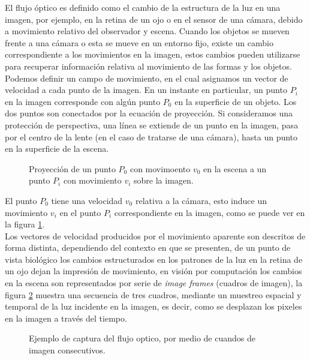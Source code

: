 \documentclass{iccmemoria}
\begin{document}
El flujo óptico es definido como el cambio de la estructura de la luz en una imagen, por ejemplo, en la retina de un ojo o en el sensor de una cámara, debido a movimiento relativo del observador y escena. Cuando los objetos se mueven frente a una cámara o esta se mueve en un entorno fijo, existe un cambio correspondiente a los movimientos en la imagen, estos cambios pueden utilizarse para recuperar información relativa al movimiento de las formas y los objetos.\\

Podemos definir un campo de movimiento, en el cual asignamos un vector de velocidad a cada punto de la imagen. En un instante en particular, un punto $P_i$ en la imagen corresponde con algún punto $P_0$ en la superficie de un objeto. Los dos puntos son conectados por la ecuación de proyección. Si consideramos una protección de perspectiva, una línea se extiende de un punto en la imagen, pasa por el centro de la lente (en el caso de tratarse de una cámara), hasta un punto en la superficie de la escena.\\


\begin{figure}[H]
  \centering
  
  \caption{Proyección de un punto $P_0$ con movimoento $v_0$ en la escena  a un punto $P_i$ con movimiento $v_i$ sobre la imagen.}
  \label{fig:proyeccion_flujo_optico}
\end{figure}

El punto $P_{0}$ tiene una velocidad $v_{0}$ relativa a la cámara, esto induce un movimiento $v_{i}$ en el punto $P_{i}$ correspondiente en la imagen, como se puede ver en la figura \ref{fig:proyeccion_flujo_optico}\cite{horn1986robot}.\\

Los vectores de velocidad producidos por el movimiento aparente son descritos de forma distinta, dependiendo del contexto en que se presenten, de un punto de vista biológico los cambios estructurados en los patrones de la luz en la retina de un ojo dejan la impresión de movimiento, en visión por computación los cambios en la escena son representados por serie de \emph{image frames} (cuadros de imagen), la figura \ref{fig:ejemplo_flujo_optico} muestra una secuencia de tres cuadros, mediante un muestreo espacial y temporal de la luz incidente en la imagen, es decir, como se desplazan los pixeles en la imagen a través del tiempo.\\

\begin{figure}[H]
  \centering
  
  \caption{Ejemplo de captura del flujo optico, por medio de cuandos de imagen consecutivos.}
  \label{fig:ejemplo_flujo_optico}
\end{figure}
\end{document}
